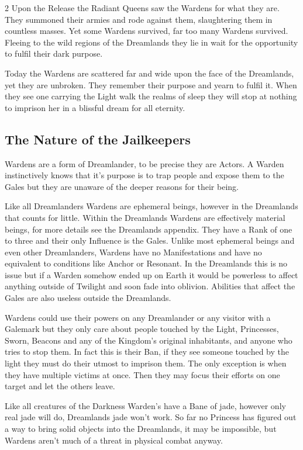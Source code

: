 \begin{multicols}{2}
Upon the Release the Radiant Queens saw the Wardens for what they are. They summoned their armies and rode against them, slaughtering them in countless masses. Yet some Wardens survived, far too many Wardens survived. Fleeing to the wild regions of the Dreamlands they lie in wait for the opportunity to fulfil their dark purpose.

Today the Wardens are scattered far and wide upon the face of the Dreamlands, yet they are unbroken. They remember their purpose and yearn to fulfil it. When they see one carrying the Light walk the realms of sleep they will stop at nothing to imprison her in a blissful dream for all eternity. 

\subsection*{The Nature of the Jailkeepers}
Wardens are a form of Dreamlander, to be precise they are Actors. A Warden instinctively knows that it's purpose is to trap people and expose them to the Gales but they are unaware of the deeper reasons for their being.

Like all Dreamlanders Wardens are ephemeral beings, however in the Dreamlands that counts for little. Within the Dreamlands Wardens are effectively material beings, for more details see the Dreamlands appendix. They have a Rank of one to three and their only Influence is the Gales. Unlike most ephemeral beings and even other Dreamlanders, Wardens have no Manifestations and have no equivalent to conditions like Anchor or Resonant. In the Dreamlands this is no issue but if a Warden somehow ended up on Earth it would be powerless to affect anything outside of Twilight and soon fade into oblivion. Abilities that affect the Gales are also useless outside the Dreamlands.

Wardens could use their powers on any Dreamlander or any visitor with a Galemark but they only care about people touched by the Light, Princesses, Sworn, Beacons and any of the Kingdom's original inhabitants, and anyone who tries to stop them. In fact this is their Ban, if they see someone touched by the light they must do their utmost to imprison them. The only exception is when they have multiple victims at once. Then they may focus their efforts on one target and let the others leave. 

Like all creatures of the Darkness Warden's have a Bane of jade, however only real jade will do, Dreamlands jade won't work. So far no Princess has figured out a way to bring solid objects into the Dreamlands, it may be impossible, but Wardens aren't much of a threat in physical combat anyway. 


\end{multicols}
